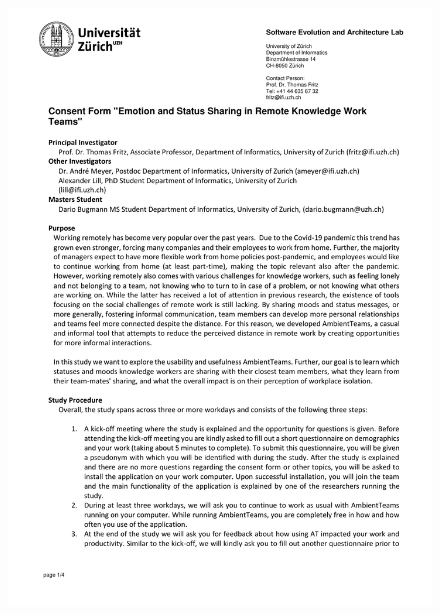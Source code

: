 \begin{figure}[h]
    \centering
    \includegraphics[width=\linewidth, page=2]{./documents/consent_form.pdf}
\end{figure}

